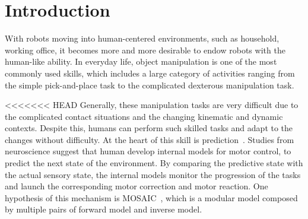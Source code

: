 \section{Introduction}
\label{intro}
With robots moving into human-centered environments, such as household, working office, it becomes more and more desirable to endow robots with the human-like ability. In everyday life, object manipulation is one of the most commonly used skills, which includes a large category of activities ranging from the simple pick-and-place task to the complicated dexterous manipulation task.


<<<<<<< HEAD
Generally, these manipulation tasks are very difficult due to the complicated contact situations and the changing kinematic and dynamic contexts. Despite this, humans can perform such skilled tasks and adapt to the changes without difficulty. At the heart of this skill is prediction~\cite{flanagan2006control}. Studies from neuroscience suggest that human develop internal models for motor control, to predict the next state of the environment. By comparing the predictive state with the actual sensory state, the internal models monitor the progression of the tasks and launch the corresponding motor correction and motor reaction. One hypothesis of this mechanism is MOSAIC~\cite{haruno2001mosaic}, which is a modular model composed by multiple pairs of forward model and inverse model. %


